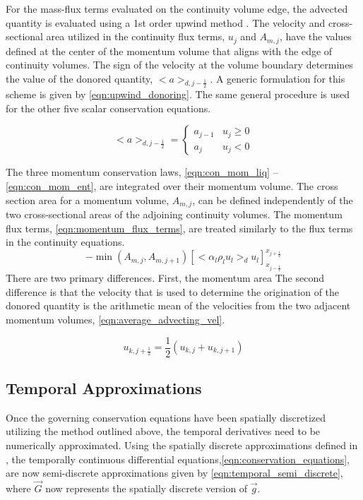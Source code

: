 For the mass-flux terms evaluated on the continuity volume edge, the advected quantity is evaluated using a 1st order upwind method \cite{Tannehill1997}.
The velocity and cross-sectional area utilized in the continuity flux terms, $u_j$ and $A_{m,j}$, have the values defined at the center of the momentum volume that aligns with the edge of continuity volumes.
The sign of the velocity at the volume boundary determines the value of the donored quantity, $<a>_{d,j-\frac{1}{2}}$.
A generic formulation for this scheme is given by \eqref{eqn:upwind_donoring}.
The same general procedure is used for the other five scalar conservation equations.

\begin{equation}
\label{eqn:upwind_donoring}
<a>_{d, j-\frac{1}{2}} = \begin{cases} a_{j-1} &  u_j \geq 0 \\ a_{j} & u_j < 0 \end{cases}
\end{equation}

The three momentum conservation laws, \eqref{eqn:con_mom_liq} -- \eqref{eqn:con_mom_ent}, are integrated over their momentum volume.
The cross section area for a momentum volume, $A_{m,j}$, can be defined independently of the two cross-sectional areas of the adjoining continuity volumes.
The momentum flux terms, \eqref{eqn:momentum_flux_terms}, are treated similarly to the flux terms in the continuity equations.
\begin{equation}
\label{eqn:momentum_flux_terms}
-\min\left(A_{m,j}, A_{m,j+1}\right)\left[<\alpha_l \rho_l u_l>_{d} u_l\right]_{x_{j-\frac{1}{2}}}^{x_{j+\frac{1}{2}}}
\end{equation}
There are two primary differences.
First, the momentum area 
The second difference is that the velocity that is used to determine the origination of the donored quantity is the arithmetic mean of the velocities from the two adjacent momentum volumes, \eqref{eqn:average_advecting_vel}.

\begin{equation}
\label{eqn:average_advecting_vel}
u_{k,j+\frac{1}{2}} = \frac{1}{2}\left(u_{k,j} + u_{k, j+1}\right)
\end{equation}

\subsection{Temporal Approximations}
\label{subsect:temporal_approx}
Once the governing conservation equations have been spatially discretized utilizing the method outlined above, the temporal derivatives need to be numerically approximated.
Using the spatially discrete approximations defined in , the temporally continuous differential equations,\eqref{eqn:conservation_equations}, are now semi-discrete approximations given by \eqref{eqn:temporal_semi_discrete}, where $\vec{G}$ now represents the spatially discrete version of $\vec{g}$.

